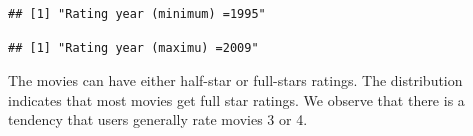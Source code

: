 \documentclass[]{article}
\newenvironment{Shaded}{\begin{snugshade}}{\end{snugshade}}
\newcommand{\CommentTok}[1]{\textcolor[rgb]{0.56,0.35,0.01}{\textit{#1}}}
\newcommand{\DataTypeTok}[1]{\textcolor[rgb]{0.13,0.29,0.53}{#1}}
\newcommand{\KeywordTok}[1]{\textcolor[rgb]{0.13,0.29,0.53}{\textbf{#1}}}
\newcommand{\NormalTok}[1]{#1}
\newcommand{\OperatorTok}[1]{\textcolor[rgb]{0.81,0.36,0.00}{\textbf{#1}}}
\newcommand{\StringTok}[1]{\textcolor[rgb]{0.31,0.60,0.02}{#1}}
\begin{document}
\begin{Shaded}
\end{Shaded}

\begin{verbatim}
## [1] "Rating year (minimum) =1995"
\end{verbatim}

\begin{Shaded}
\end{Shaded}

\begin{verbatim}
## [1] "Rating year (maximu) =2009"
\end{verbatim}

The movies can have either half-star or full-stars ratings. The
distribution indicates that most movies get full star ratings. We
observe that there is a tendency that users generally rate movies 3 or
4.
\end{document}
